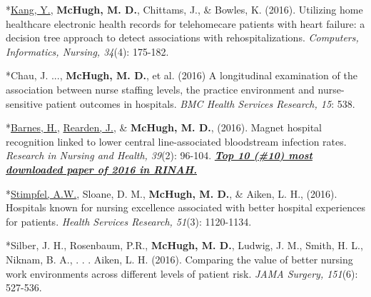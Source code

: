 \documentclass[10pt,]{article}
\begin{document}
{{{{{{{{{{{{{{\begin{hangparas}{.25in}{1}
*{\underline {Kang, Y.}}, {\textbf {McHugh, M. D.}}, Chittams, J., \& Bowles, K. (2016). Utilizing home healthcare electronic health records for telehomecare patients with heart failure: a decision tree approach to detect associations with rehospitalizations. {\textit {Computers, Informatics, Nursing, 34}}(4): 175-182.

\end{hangparas}

\vspace{4mm}

\begin{hangparas}{.25in}{1}

*Chau, J. ..., {\textbf {McHugh, M. D.}}, et al. (2016) A longitudinal examination of the association between nurse staffing levels, the practice environment and nurse-sensitive patient outcomes in hospitals. {\textit {BMC Health Services Research, 15}}: 538.

\end{hangparas}

\vspace{4mm}

\begin{hangparas}{.25in}{1}

*{\underline {Barnes, H.}}, {\underline {Rearden, J.}}, \& {\textbf {McHugh, M. D.}}, (2016). Magnet hospital recognition linked to lower central line-associated bloodstream infection rates. {\textit {Research in Nursing and Health, 39}}(2): 96-104. {\textit {\textbf {\underline {Top 10 (\#10) most downloaded paper of 2016 in RINAH.}}}}

\end{hangparas}

\vspace{4mm}

\begin{hangparas}{.25in}{1}

*{\underline {Stimpfel, A.W.}}, Sloane, D. M., {\textbf {McHugh, M. D.}}, \& Aiken, L. H., (2016). Hospitals known for nursing excellence associated with better hospital experiences for patients. {\textit {Health Services Research, 51}}(3): 1120-1134.

\end{hangparas}

\vspace{4mm}

\begin{hangparas}{.25in}{1}

*Silber, J. H., Rosenbaum, P.R., {\textbf {McHugh, M. D.}}, Ludwig, J. M., Smith, H. L., Niknam, B. A., . . . Aiken, L. H. (2016). Comparing the value of better nursing work environments across different levels of patient risk. {\textit {JAMA Surgery, 151}}(6): 527-536.


\end{hangparas}}}}}}}}}}}}}}}
\end{document}
